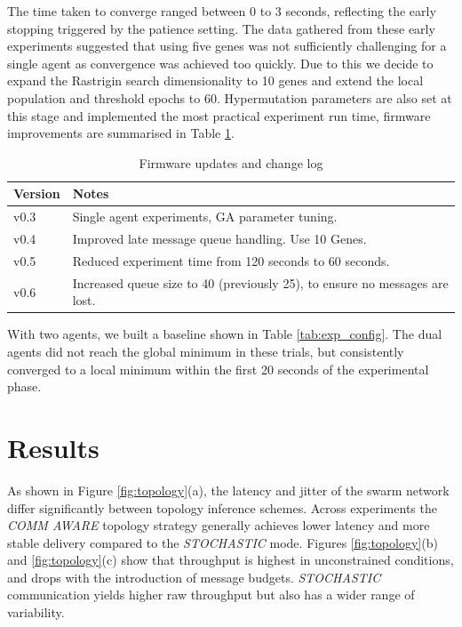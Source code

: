 \documentclass[conference]{IEEEtran}
\begin{document}
The time taken to converge ranged between 0 to 3 seconds, reflecting the early stopping triggered by the patience setting. The data gathered from these early experiments suggested that using five genes was not sufficiently challenging for a single agent as convergence was achieved too quickly. Due to this we decide to expand the Rastrigin search dimensionality to 10 genes and extend the local population and threshold epochs to 60. Hypermutation parameters are also set at this stage and implemented the most practical experiment run time, firmware improvements are summarised in Table \ref{tab:firmware_versions}.

\begin{table}[H]
\centering
\caption{Firmware updates and change log}
\begin{tabular}{@{} l p{7.5cm} @{}} 
\toprule
\textbf{Version} & \textbf{Notes} \\
\midrule
v0.3 & Single agent experiments, GA parameter tuning. \\
v0.4 & Improved late message queue handling. Use 10 Genes.\\
v0.5 & Reduced experiment time from 120 seconds to 60 seconds. \\
v0.6 & Increased queue size to 40 (previously 25), to ensure no messages are lost.\\
\bottomrule
\end{tabular}
\label{tab:firmware_versions}
\end{table}

With two agents, we built a baseline shown in Table \ref{tab:exp_config}. The dual agents did not reach the global minimum in these trials, but consistently converged to a local minimum within the first 20 seconds of the experimental phase.

\section{Results}

As shown in Figure \ref{fig:topology}(a), the latency and jitter of the swarm network differ significantly between topology inference schemes. Across experiments the \emph{COMM AWARE} topology strategy generally achieves lower latency and more stable delivery compared to the \emph{STOCHASTIC} mode. Figures \ref{fig:topology}(b) and \ref{fig:topology}(c) show that throughput is highest in unconstrained conditions, and drops with the introduction of message budgets. \emph{STOCHASTIC} communication yields higher raw throughput but also has a wider range of variability.
\end{document}
